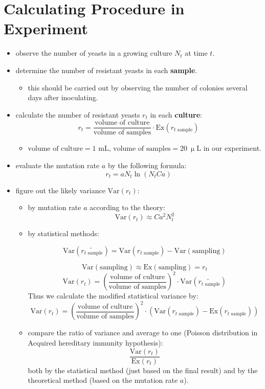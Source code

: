 \documentclass[UTF-8]{article}
\begin{document}
\section{Calculating Procedure in Experiment}
\begin{itemize}
    \item observe the number of yeasts in a growing culture $N_t$ at time $t$.
    \item determine the number of resistant yeasts in each \textbf{sample}.
    \begin{itemize}
        \item this should be carried out by observing the number of colonies several days after inoculating.
    \end{itemize}
    \item calculate the number of resistant yeasts $r_t$ in each \textbf{culture}:
    $$
    r_t=\frac{\text{volume of culture}}{\text{volume of samples}}\cdot \text{Ex}(r_{t\text{ sample}})
    $$
    \begin{itemize}
        \item $\text{volume of culture}=1$ mL, $\text{volume of samples}=20\ \upmu $L in our experiment.
    \end{itemize}
    \item evaluate the mutation rate $a$ by the following formula:
    $$
    r_t=aN_t\ln(N_tCa)
    $$
    \item figure out the likely variance $\text{Var}(r_t)$:
    \begin{itemize}
        \item by mutation rate $a$ according to the theory:
        $$
        \text{Var}({r_t})\approx Ca^2N_t^2
        $$
        \item by statistical methods:
        
        $$
        \text{Var}(\tilde{r_{t \text{ sample}}})=\text{Var}(r_{t \text{ sample}})-\text{Var}(\text{sampling})
        $$

        $$
        \text{Var}(\text{sampling})\approx\text{Ex}(\text{sampling})=r_t
        $$
        $$
        \text{Var}({r_t})=\left( \frac{\text{volume of culture}}{\text{volume of samples}} \right)^2\cdot\text{Var}(\tilde{r_{t \text{ sample}}}) 
        $$
        Thus we calculate the modified statistical variance by:
        $$
        \text{Var}({r_t})=\left( \frac{\text{volume of culture}}{\text{volume of samples}} \right)^2\cdot(\text{Var}(r_{t \text{ sample}}) -\text{Ex}(r_{t \text{ sample}}))
        $$
        \item compare the ratio of variance and average to one (Poisson distribution in Acquired hereditary immunity hypothesis):
        $$
        \frac{\text{Var}(r_t)}{\text{Ex}(r_t)}
        $$
        both by the statistical method (just based on the final result) and by the theoretical method (based on the mutation rate $a$).
    \end{itemize}


\end{itemize}
\end{document}
